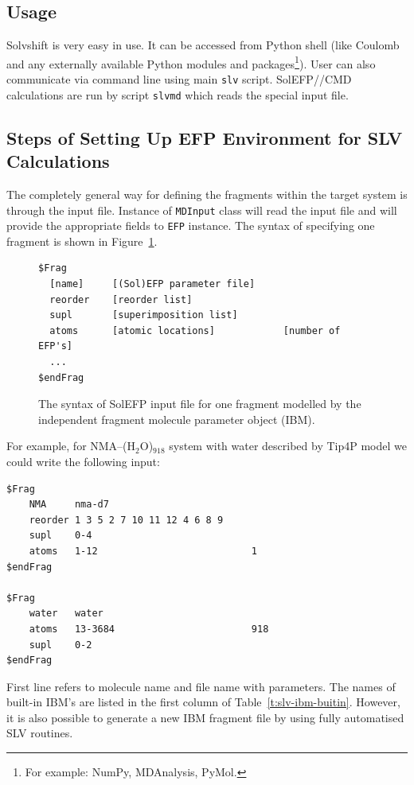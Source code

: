 \documentclass[b5paper,oneside,fleqn,11pt]{book}
\begin{document}
\begin{refsection}
\section{Usage}

Solvshift is very easy in use. It can be accessed 
from Python shell (like {\sc Coulomb} and any externally
available Python modules and packages\footnote{For example: NumPy, MDAnalysis, PyMol.}).
User can also communicate via command line using main {\tt slv} script.
SolEFP//CMD calculations are run by script {\tt slv{\textunderscore}md} which reads the
special input file.

\subsection{Steps of Setting Up EFP Environment for SLV Calculations}

The completely general way for defining the fragments within the target system
is through the input file. 
Instance of {\tt MDInput} class
will read the input file and will provide the appropriate fields to {\tt EFP} instance. 
The syntax of specifying one fragment
is shown in Figure~\ref{f:slv-inp-file-syntax}.
%
\begin{figure}[t!]
\centering
\setlength\fboxsep{0.4pt}
\setlength\fboxrule{0.5pt}
\begin{verbatim}
$Frag
  [name]     [(Sol)EFP parameter file]
  reorder    [reorder list]
  supl       [superimposition list]
  atoms      [atomic locations]            [number of EFP's]
  ...
$endFrag
\end{verbatim}
\caption{
The syntax of SolEFP input file for one fragment modelled by the
independent fragment molecule parameter object (IBM).
\label{f:slv-inp-file-syntax}}
\end{figure}
%
For example, for NMA--(H$_2$O)$_{918}$ system 
with water described by Tip4P model we could 
write the following input:
%
\begin{verbatim}
$Frag
    NMA     nma-d7
    reorder 1 3 5 2 7 10 11 12 4 6 8 9
    supl    0-4
    atoms   1-12                           1
$endFrag

$Frag
    water   water
    atoms   13-3684                        918
    supl    0-2
$endFrag
\end{verbatim}
%
First line refers to molecule name and file name with parameters. 
The names of built-in IBM's are listed in the first column
of Table~\ref{t:slv-ibm-buitin}.
However, it is also possible to generate a new IBM fragment file
by using fully automatised SLV routines.


\end{refsection}
\end{document}
